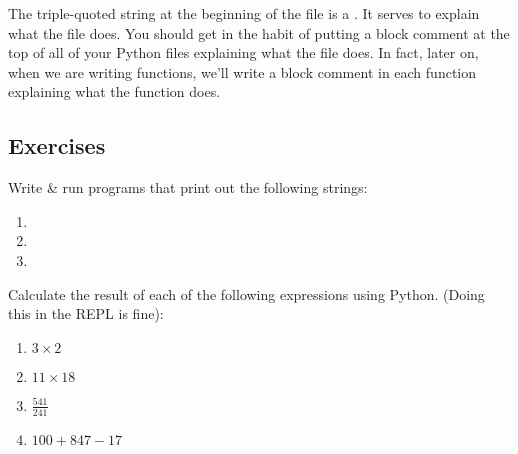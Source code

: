 \begin{remark}
  The triple-quoted string at the beginning of the file is a
  . It serves to explain what the file does. You
  should get in the habit of putting a block comment at the top of all
  of your Python files explaining what the file does. In fact, later
  on, when we are writing functions, we'll write a block comment in
  each function explaining what the function does.
\end{remark}

\subsection{Exercises}

\begin{exercise}
  Write \& run programs that print out the following strings:

  \begin{enumerate}
  \item {}
  \item {}
  \item {}
  \end{enumerate}
\end{exercise}

\begin{exercise}
  Calculate the result of each of the following expressions using
  Python. (Doing this in the REPL is fine):

  \begin{enumerate}
  \item $3 \times 2$
  \item $11 \times 18$
  \item $\frac{541}{241}$
  \item $100 + 847 - 17$
  \end{enumerate}
\end{exercise}

